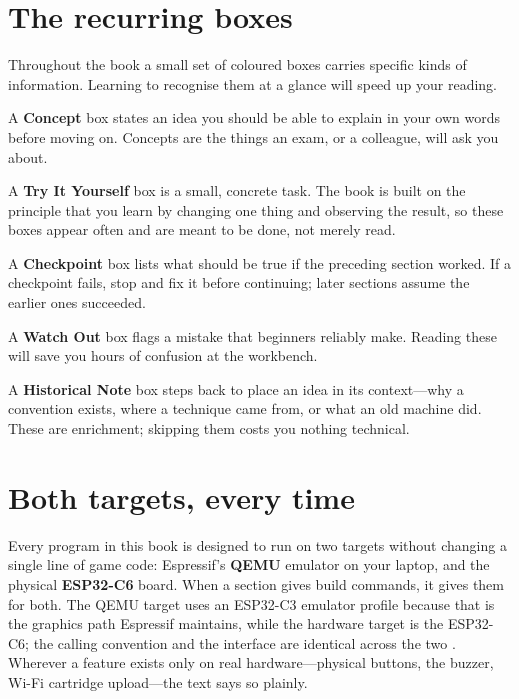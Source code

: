 \section*{The recurring boxes}

Throughout the book a small set of coloured boxes carries specific kinds of
information. Learning to recognise them at a glance will speed up your reading.

\begin{prgconcept}
A \textbf{Concept} box states an idea you should be able to explain in your own
words before moving on. Concepts are the things an exam, or a colleague, will ask
you about.
\end{prgconcept}

\begin{prgtry}
A \textbf{Try It Yourself} box is a small, concrete task. The book is built on the
principle that you learn by changing one thing and observing the result, so these
boxes appear often and are meant to be done, not merely read.
\end{prgtry}

\begin{prgcheck}
A \textbf{Checkpoint} box lists what should be true if the preceding section
worked. If a checkpoint fails, stop and fix it before continuing; later sections
assume the earlier ones succeeded.
\end{prgcheck}

\begin{prgwarn}
A \textbf{Watch Out} box flags a mistake that beginners reliably make. Reading
these will save you hours of confusion at the workbench.
\end{prgwarn}

\begin{prgaside}
A \textbf{Historical Note} box steps back to place an idea in its context---why a
convention exists, where a technique came from, or what an old machine did. These
are enrichment; skipping them costs you nothing technical.
\end{prgaside}

\section*{Both targets, every time}

Every program in this book is designed to run on two targets without changing a
single line of game code: Espressif's \textbf{QEMU} emulator on your laptop, and
the physical \textbf{ESP32\nobreakdash-C6} board. When a section gives build commands, it
gives them for both. The QEMU target uses an ESP32\nobreakdash-C3 emulator profile because
that is the \riscv graphics path Espressif maintains, while the hardware target
is the ESP32\nobreakdash-C6; the \riscv calling convention and the \prg interface are
identical across the two \citep{prg32qemu}. Wherever a feature exists only on real
hardware---physical buttons, the buzzer, Wi\nobreakdash-Fi cartridge upload---the text says
so plainly.

